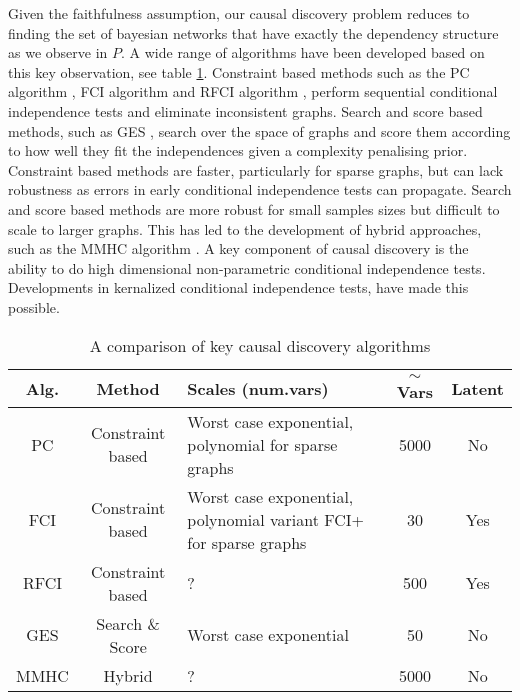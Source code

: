 \documentclass[11pt,a4paper]{article}
\begin{document}
Given the faithfulness assumption, our causal discovery problem reduces to finding the set of bayesian networks that have exactly the dependency structure as we observe in $P$. A wide range of algorithms have been developed based on this key observation, see table \ref{table:discovery_algorithms}. Constraint based methods such as the PC algorithm \cite{Sprites2000}, FCI algorithm \cite{Sprites2000} and RFCI algorithm \cite{Colombo2012}, perform sequential conditional independence tests and eliminate inconsistent graphs. Search and score based methods, such as GES \cite{Chickering2002}, search over the space of graphs and score them according to how well they fit the independences given a complexity penalising prior. Constraint based methods are faster, particularly for sparse graphs, but can lack robustness as errors in early conditional independence tests can propagate. Search and score based methods are more robust for small samples sizes but difficult to scale to larger graphs. This has led to the development of hybrid approaches, such as the MMHC algorithm \cite{Tsamardinos2006}. A key component of causal discovery is the ability to do high dimensional non-parametric conditional independence tests. Developments in kernalized conditional independence tests,\cite{Gretton2008,Zhang2012} have made this possible.


\begin{table}[h]
\centering
\caption{A comparison of key causal discovery algorithms}
\label{table:discovery_algorithms}
\renewcommand{\arraystretch}{1.5}
\begin{tabular}{| c | c | p{4cm} | c | c |}
\hline
  \textbf {Alg.} &\textbf{ Method }& \textbf{Scales (num.vars) }& $\sim $ \textbf {Vars} & \textbf {Latent }  \\
  \hline
  PC & Constraint based & Worst case exponential, polynomial for sparse graphs & 5000 & No  \\ 
  \hline
  FCI & Constraint based & Worst case exponential, polynomial variant FCI+ for sparse graphs & 30 & Yes\\
  \hline
  RFCI & Constraint based & ? & 500 & Yes  \\
  \hline
  GES & Search \& Score  & Worst case exponential & 50 & No  \\
  \hline
  MMHC & Hybrid & ? & 5000 & No  \\
 \hline
\end{tabular}
\end{table}

 
\end{document}
